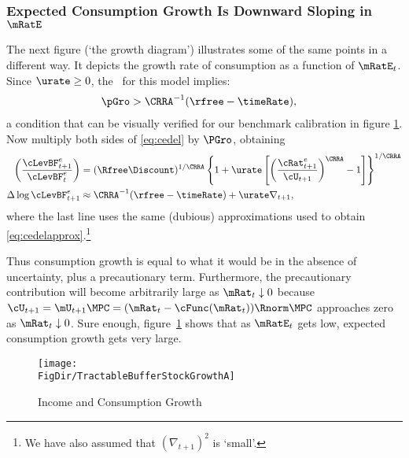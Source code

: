 \documentclass{\handout}
\begin{document}
\subsubsection{Expected Consumption Growth Is Downward Sloping in $\mRatE$}
The next figure (`the growth diagram') illustrates some of the same points in a different
way.  It depicts the growth rate of consumption as a function of $\mRatE_{t}$.
Since $\urate \geq 0$, the \GICPGro~for this model
implies:
\begin{equation}\begin{gathered}\begin{aligned}
  \pGro & >  \CRRA^{-1}(\rfree-\timeRate) ,
\end{aligned}\end{gathered}\end{equation}
a condition that can be visually verified for our benchmark calibration in figure \ref{fig:GrowthA}.  Now multiply both sides of \eqref{eq:cedel} by $\PGro$, obtaining
\begin{equation}\begin{gathered}\begin{aligned}
        \left(\frac{\cLevBF^{e}_{t+1}}{\cLevBF^{e}_{t}}\right) & =  (\Rfree\Discount)^{1/\CRRA} \left\{1+\urate\left[\left(\frac{{\cRat}^{e}_{t+1}}{\cU_{t+1}}\right)^{\CRRA}-1\right]\right\}^{1/\CRRA} \label{eq:cLevGro}
\\       \Delta \log \cLevBF^{e}_{t+1} & \approx  \CRRA^{-1}(\rfree-\timeRate) +  \urate \nabla _{t+1}, %
\end{aligned}\end{gathered}\end{equation}
where the last line uses the same (dubious) approximations used to obtain
\eqref{eq:cedelapprox}.\footnote{We have also assumed that $(\nabla _{t+1})^{2}$ is `small'.}

Thus consumption growth is equal to what it would be in the absence of
uncertainty, plus a precautionary term.  Furthermore, 
the precautionary contribution will become arbitrarily large as $\mRat_{t}
\downarrow 0$ because $\cU_{t+1} = \mU_{t+1}\MPCU  =
(\mRat_{t}-\cFunc(\mRat_{t}))\Rnorm\MPCU$ approaches zero as $\mRat_{t} \downarrow 0$.  Sure
enough, figure~\ref{fig:GrowthA} shows that as $\mRatE_{t}$
gets low, expected consumption growth gets very large.


\begin{figure}
\caption{Income and Consumption Growth}\label{fig:GrowthA}
\texttt{[image: \\FigDir/TractableBufferStockGrowthA]}
\end{figure}
\end{document}
